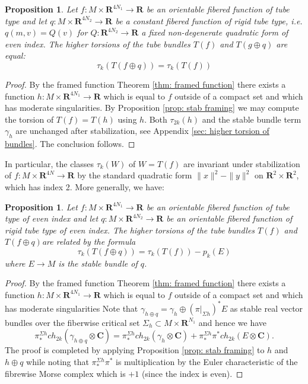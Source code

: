 \documentclass{amsart}
\def\bC{\mathbf{C}}
\def\bR{\mathbf{R}}
\newtheorem{proposition}[theorem]{Proposition}
\theoremstyle{definition}
\theoremstyle{remark}
\newtheorem{inductive lemma}[theorem]{Inductive Lemma}
\begin{document}
\begin{proposition}\label{prop: effect stab}
Let $f:M \times \bR^{4N_1} \to \bR$ be an orientable  fibered  function of tube type and let $q:M \times \bR^{4N_2} \to \bR$ be a constant fibered function of rigid tube type, i.e. $q(m,v)=Q(v)$ for $Q:\bR^{4N_2} \to \bR$ a fixed non-degenerate quadratic form of even index. The higher  torsions of the tube bundles $T(f)$ and $T(g \oplus q)$ are equal:%
$$ \tau_k(T(f \oplus q) ) = \tau_k(T(f))  $$
\end{proposition}

\begin{proof}
By the framed function Theorem \ref{thm: framed function} there exists a function $h:M \times \bR^{4N_1} \to \bR$ which is equal to $f$ outside of a compact set and which has moderate singularities. By Proposition \ref{prop: stab framing} we may compute the torsion of $T(f)=T(h)$ using $h$. Both $\tau_{2k}(h)$ and the stable bundle term $\gamma_h$ are unchanged after stabilization, see Appendix \ref{sec: higher torsion of bundles}. The conclusion follows.
\end{proof}

In particular, the classes $\tau_k(W)$ of $W=T(f)$ are invariant under stabilization of $f:M \times \bR^{4N} \to \bR$ by the standard quadratic form $\|x\|^2-\|y\|^2$ on $\bR^2\times \bR^2$, which has index 2. More generally, we have:


\begin{proposition}\label{prop: effect twisted stab}
Let $f:M \times \bR^{4N_1} \to \bR$ be an orientable  fibered  function of tube type of even index and let $q:M \times \bR^{4N_2} \to \bR$ be an orientable fibered function of rigid tube type of even index. The higher torsions of the tube bundles $T(f)$ and $T(f \oplus q)$are related by the formula
$$ \tau_k(T(f \oplus q) ) = \tau_k(T(f))  - p_k(E) $$
where $E \to M$ is the stable bundle of $q$.
\end{proposition}

\begin{proof}
By the framed function Theorem \ref{thm: framed function} there exists a function $h:M \times \bR^{4N_1} \to \bR$ which is equal to $f$ outside of a compact set and which has moderate singularities  Note that $\gamma_{h \oplus q} = \gamma_h \oplus (\pi|_{\Sigma h} )^*E$ as stable real vector bundles over the fiberwise critical set $\Sigma_h \subset M \times \bR^{N_1}$ and hence we have $$\pi_*^{\Sigma h}ch_{2k}(\gamma_{h \oplus q} \otimes \bC ) =  \pi_*^{\Sigma h}  ch_{2k}( \gamma_h  \otimes \bC) + \pi_*^{\Sigma h} \pi^* ch_{2k}(E \otimes \bC). $$
The proof is completed by applying Proposition \ref{prop: stab framing} to $h$ and $h \oplus q$ while noting that $ \pi_*^{\Sigma h} \pi^* $ is multiplication by the Euler characteristic of the fibrewise Morse complex which is $+1$ (since the index is even).%
\end{proof}
\end{document}
